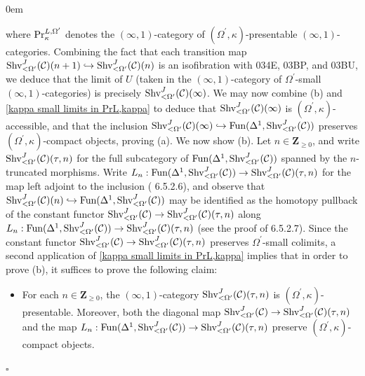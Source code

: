 \documentclass[10pt]{article}
\newcommand{\C}{\mathcal C}
\newcommand{\ZZ}{\mathbb{Z}}
\def\ZZ{{\mathbf Z}}
\renewcommand{\qed}{\hfill$\square$}
\renewenvironment{proof}{\begin{addmargin}[1em]{0em}\begin{newproof}}{\end{newproof}\end{addmargin}\qed}
\theoremstyle{witharg}
\theoremstyle{witharg}
\theoremstyle{witharg2}
\begin{document}
\begin{proof}
     \noindent where $\textnormal{Pr}^{L,\Omega^\prime}_\kappa$ denotes the $(\infty,1)$-category of $(\Omega^\prime,\kappa)$-presentable $(\infty,1)$-categories. Combining the fact that each transition map $\textnormal{Shv}^J_{<\Omega^\prime}(\C)(n+1)\hookrightarrow\textnormal{Shv}^J_{<\Omega^\prime}(\C)(n)$ is an isofibration with  034E,  03BP, and  03BU, we deduce that the limit of $U$ (taken in the $(\infty,1)$-category of $\Omega^\prime$-small $(\infty,1)$-categories) is precisely $\textnormal{Shv}^J_{<\Omega^\prime}(\C)(\infty)$. We may now combine (b) and \ref{kappa small limits in PrL,kappa} to deduce that $\textnormal{Shv}^J_{<\Omega^\prime}(\C)(\infty)$ is $(\Omega^\prime,\kappa)$-accessible, and that the inclusion $\textnormal{Shv}^J_{<\Omega^\prime}(\C)(\infty)\hookrightarrow \textnormal{Fun}(\Delta^1,\textnormal{Shv}^J_{<\Omega^\prime}(\C))$ preserves $(\Omega^\prime,\kappa)$-compact objects, proving (a). We now show (b). Let $n\in \ZZ_{\geq 0}$, and write $\textnormal{Shv}^J_{<\Omega^\prime}(\C)(\tau,n)$ for the full subcategory of $\textnormal{Fun}(\Delta^1,\textnormal{Shv}^J_{<\Omega^\prime}(\C))$ spanned by the $n$-truncated morphisms. Write $L_n:\textnormal{Fun}(\Delta^1,\textnormal{Shv}^J_{<\Omega^\prime}(\C))\rightarrow \textnormal{Shv}^J_{<\Omega^\prime}(\C)(\tau,n)$ for the map left adjoint to the inclusion ( 6.5.2.6), and observe that $\textnormal{Shv}^J_{<\Omega^\prime}(\C)(n)\hookrightarrow \textnormal{Fun}(\Delta^1,\textnormal{Shv}^J_{<\Omega^\prime}(\C))$ may be identified as the homotopy pullback of the constant functor $\textnormal{Shv}^J_{<\Omega^\prime}(\C)\rightarrow \textnormal{Shv}^J_{<\Omega^\prime}(\C)(\tau,n)$ along $L_n:\textnormal{Fun}(\Delta^1,\textnormal{Shv}^J_{<\Omega^\prime}(\C))\rightarrow \textnormal{Shv}^J_{<\Omega^\prime}(\C)(\tau,n)$ (see the proof of  6.5.2.7). Since the constant functor $\textnormal{Shv}^J_{<\Omega^\prime}(\C)\rightarrow \textnormal{Shv}^J_{<\Omega^\prime}(\C)(\tau,n)$ preserves $\Omega^\prime$-small colimits, a second application of \ref{kappa small limits in PrL,kappa} implies that in order to prove (b), it suffices to prove the following claim:

     \begin{itemize}
     
         \item [(c)] For each $n\in \ZZ_{\geq 0}$, the $(\infty,1)$-category $\textnormal{Shv}^J_{<\Omega^\prime}(\C)(\tau,n)$ is $(\Omega^\prime,\kappa)$-presentable. Moreover, both the diagonal map $\textnormal{Shv}^J_{<\Omega^\prime}(\C)\rightarrow \textnormal{Shv}^J_{<\Omega^\prime}(\C)(\tau,n)$ and the map $L_n:\textnormal{Fun}(\Delta^1,\textnormal{Shv}^J_{<\Omega^\prime}(\C))\rightarrow \textnormal{Shv}^J_{<\Omega^\prime}(\C)(\tau,n)$ preserve $(\Omega^\prime,\kappa)$-compact objects. 
         

\end{itemize}
\end{proof}
\end{document}
